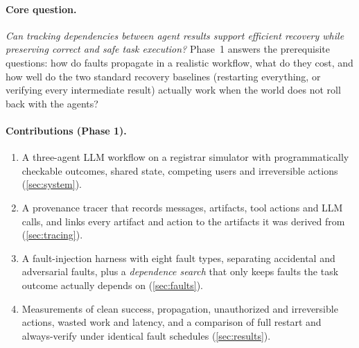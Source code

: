 \documentclass[11pt]{article}
\begin{document}
\paragraph{Core question.} \emph{Can tracking dependencies between agent
results support efficient recovery while preserving correct and safe task
execution?} Phase~1 answers the prerequisite questions: how do faults
propagate in a realistic workflow, what do they cost, and how well do the two
standard recovery baselines (restarting everything, or verifying every
intermediate result) actually work when the world does not roll back with
the agents?

\paragraph{Contributions (Phase 1).}
\begin{enumerate}[leftmargin=*,itemsep=2pt]
  \item A three-agent LLM workflow on a registrar simulator with
        programmatically checkable outcomes, shared state, competing users
        and irreversible actions (\cref{sec:system}).
  \item A provenance tracer that records messages, artifacts, tool actions and
        LLM calls, and links every artifact and action to the artifacts it was
        derived from (\cref{sec:tracing}).
  \item A fault-injection harness with eight fault types, separating
        accidental and adversarial faults, plus a \emph{dependence search}
        that only keeps faults the task outcome actually depends on
        (\cref{sec:faults}).
  \item Measurements of clean success, propagation, unauthorized and
        irreversible actions, wasted work and latency, and a comparison of
        full restart and always-verify under identical fault schedules
        (\cref{sec:results}).
\end{enumerate}

\end{document}
